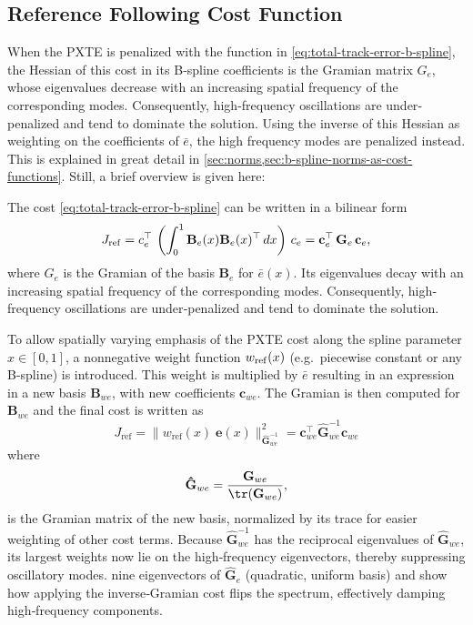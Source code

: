 \subsection{Reference Following Cost Function}\label{sec:oscillations}

When the PXTE is penalized with the function in \cref{eq:total-track-error-b-spline}, 
the Hessian of this cost in its B‐spline coefficients is the Gramian matrix $G_e$, whose eigenvalues decrease with an increasing spatial frequency of the corresponding modes.  Consequently, high‐frequency oscillations are under‐penalized and tend to dominate the solution. Using the inverse of this Hessian as weighting on the coefficients of $\bar e$, the high frequency modes are penalized instead. This is explained in great detail in \cref{sec:norms,sec:b-spline-norms-as-cost-functions}. Still, a brief overview is given here:

The cost \cref{eq:total-track-error-b-spline} can be written in a bilinear form
\begin{equation}\label{eq:cost-reference-following-bilinear}
  J_{\rm ref} = c_e^\top\,\left(\int_0^1 \mathbf B_e(x) \mathbf B_e(x)^\top \, dx\right)\,c_e =
  \mathbf c_e^\top\,\mathbf G_e\, \mathbf c_e,
\end{equation}
where \(G_e\) is the Gramian of the basis $\mathbf B_e$ for \(\bar e(x)\). Its eigenvalues decay with an increasing spatial frequency of the corresponding modes. Consequently, high‐frequency oscillations are under‐penalized and tend to dominate the solution.

To allow spatially varying emphasis of the PXTE cost along the spline parameter $x\in[0,1]$, a nonnegative weight function $w_{\rm ref}(x)$ (e.g.\ piecewise constant or any B-spline) is introduced. This weight is multiplied by $\bar e$ resulting in an expression in a new basis $\mathbf B_{we}$, with new coefficients $\mathbf c_{we}$. The Gramian is then computed for $\mathbf B_{we}$ and the final cost is written as
\begin{equation}\label{eq:cost-reference-following-gramian}
    J_\text{ref} = \|w_\text{ref}(x)\;\mathbf e(x)\|_{\mathbf{\hat G}_{we}^{-1}}^2 
    = \mathbf{c}_{we}^\top \mathbf{\hat G}_{we}^{-1} \mathbf{c}_{we}
\end{equation}
where
\begin{equation}\label{eq:gramian-density}
    \mathbf{\hat G}_{we} = \frac{\mathbf G_{we}}{\tr(\mathbf G_{we})}, 
\end{equation}
is the Gramian matrix of the new basis, normalized by its trace for easier weighting of other cost terms. 
Because $\mathbf{\hat G}_{we}^{-1}$ has the reciprocal eigenvalues of $\mathbf{\hat G}_{we}$, its largest weights now lie on the high‐frequency eigenvectors, thereby suppressing oscillatory modes.  nine eigenvectors of $\mathbf{\hat G}_e$ (quadratic, uniform basis) and show how applying the inverse‐Gramian cost flips the spectrum, effectively damping high‐frequency components.


